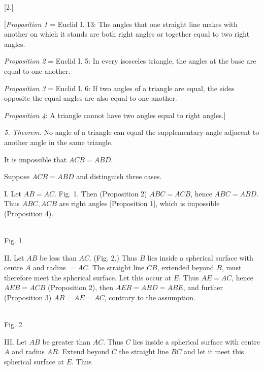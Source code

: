 \begin{center}[2.]\end{center}


[\emph{Proposition 1} = Euclid I. 13: The angles that one straight line makes with another
on which it stands are both right angles or together equal
to two right angles.

\emph{Proposition 2} = Euclid I. 5: In every isosceles triangle, the
angles at the base are equal to one another.

\emph{Proposition 3} = Euclid I. 6: If two angles of a triangle are
equal, the sides opposite the equal angles are also equal to one another.

\emph{Proposition 4}: A triangle cannot have two angles equal to right
angles.]

\emph{5. Theorem.} No angle of a triangle can equal the supplementary angle adjacent to
another angle in the same triangle.

It is impossible that $ACB = ABD$.

 Suppose $ACB = ABD$ and distinguish three
cases.

I. Let $AB = AC$. Fig. 1. Then (Proposition 2) $ABC = ACB$, hence
$ABC = ABD$. Thus $ABC, ACB$ are right angles [Proposition 1], which is
impossible (Proposition 4).



\begin{center}
\\[3pt]Fig. 1.
\end{center}

II. Let $AB$ be less than $AC$. (Fig. 2.) Thus $B$ lies inside
a spherical surface with centre $A$ and radius $=AC$. The straight line
$CB$, extended beyond $B$, must therefore meet the spherical surface. Let this
occur at $E$. Thus $AE=AC$, hence $AEB=ACB$ (Proposition 2), then
$AEB=ABD=ABE$, and further (Proposition 3) $AB=AE=AC$, contrary to the assumption.



\begin{center}
\\[3pt]Fig. 2.
\end{center}

III. Let $AB$ be greater than $AC$. Thus $C$ lies inside a
spherical surface with centre $A$ and radius $AB$. Extend beyond
$C$ the straight line $BC$ and let it meet this spherical surface at $E$. Thus
